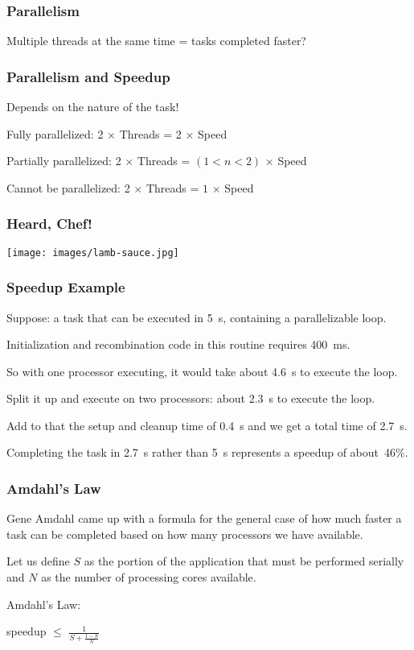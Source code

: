 \begin{frame}
	\frametitle{Parallelism}

	Multiple threads at the same time = tasks completed faster?

\end{frame}

\begin{frame}
	\frametitle{Parallelism and Speedup}

	Depends on the nature of the task!

	Fully parallelized: 2 $\times$ Threads = 2 $\times$ Speed

	Partially parallelized: 2 $\times$ Threads = $(1 < n < 2)$ $\times$ Speed

	Cannot be parallelized: 2 $\times$ Threads = $1$ $\times$ Speed

\end{frame}


\begin{frame}
	\frametitle{Heard, Chef!}

	\begin{center}
		\texttt{[image: images/lamb-sauce.jpg]}
	\end{center}

\end{frame}



\begin{frame}
	\frametitle{Speedup Example}


	Suppose: a task that can be executed in 5~s, containing a parallelizable loop.

	Initialization and recombination code in this routine requires 400~ms.

	So with one processor executing, it would take about 4.6~s to execute the loop.

	Split it up and execute on two processors: about 2.3~s to execute the loop.

	Add to that the setup and cleanup time of 0.4~s and we get a total time of 2.7~s.

	Completing the task in 2.7~s rather than 5~s represents a speedup of about~46\%.

\end{frame}


\begin{frame}
	\frametitle{Amdahl's Law}

	Gene Amdahl came up with a formula for the general case of how much faster a task can be completed based on how many processors we have available.

	Let us define $S$ as the portion of the application that must be performed serially and $N$ as the number of processing cores available.

	Amdahl's Law:

	\begin{center}
		speedup $\leq$ {\huge $\frac{1}{S + \frac{1-S}{N}}$}
	\end{center}

\end{frame}



